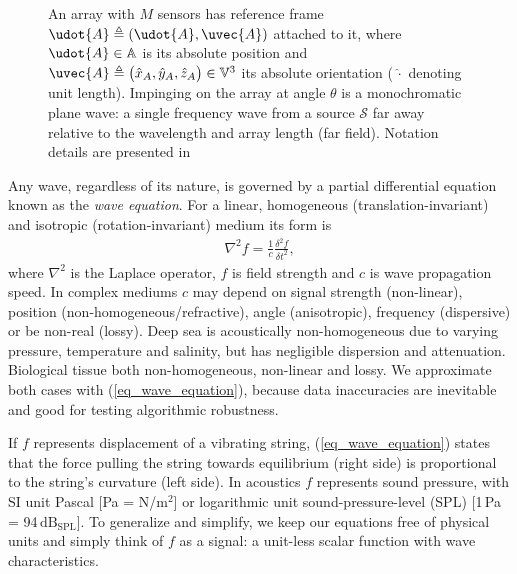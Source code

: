 {\begin{figure}[!t]\centering
{}
\caption{
An array with $M$ sensors has reference frame $\udot{A} \triangleq (\udot{A},\uvec{A})$ attached to it, where $\udot{A}\in\mathbb{A}$ is its absolute position and $\uvec{A}\triangleq\big(\hat{x}_{A},\hat{y}_{A},\hat{z}_{A}\big)\in\mathbb{V}^3$ its absolute orientation (\,$\hat{\cdot}$ denoting unit length). Impinging on the array at angle $\theta$ is a monochromatic plane wave: a single frequency wave from a source $\mathcal{S}$ far away relative to the wavelength and array length (far field). Notation details are presented in 
}%
\label{2_fig_geometry}
\end{figure}


Any wave, regardless of its nature, is governed by a partial differential equation known as the \emph{wave equation}. For a linear, homogeneous (translation-invariant) and isotropic (rotation-invariant) medium its form is
%
\begin{align}\label{eq_wave_equation}
\nabla^2 f 
 = \frac{1}{c}\frac{\delta^2 f}{\delta t^2},
\end{align}
%
where $\nabla^2$ is the Laplace operator, $f$ is field strength and $c$ is wave propagation speed. In complex mediums $c$ may depend on signal strength (non-linear), position (non-homogeneous/refractive), angle (anisotropic), frequency (dispersive) or be non-real (lossy). Deep sea is acoustically non-homogeneous due to varying pressure, temperature and salinity, but has negligible dispersion and attenuation. Biological tissue both non-homogeneous, non-linear and lossy. We approximate both cases with (\ref{eq_wave_equation}), because data inaccuracies are inevitable and good for testing algorithmic robustness.

If $f$ represents displacement of a vibrating string, (\ref{eq_wave_equation}) states that the force pulling the string towards equilibrium (right side) is proportional to the string's curvature (left side). In acoustics $f$ represents sound pressure, with SI unit Pascal [Pa = N/m$^2$] or logarithmic unit sound-pressure-level (SPL) [1\,Pa = 94\,$\mathrm{dB}_{\textrm{SPL}}$]. To generalize and simplify, we keep our equations free of physical units and simply think of $f$ as a signal: a unit-less scalar function with wave characteristics.

}

